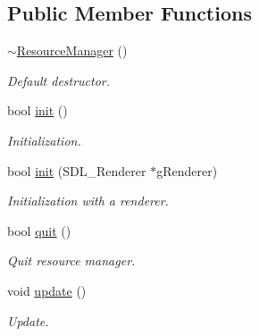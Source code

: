 \subsection*{Public Member Functions}
\begin{DoxyCompactItemize}
\item 
\mbox{\label{class_resource_manager_a671c186e4630599e7e36d000c53eaf80}} 
\mbox{\hyperlink{class_resource_manager_a671c186e4630599e7e36d000c53eaf80}{$\sim$\+Resource\+Manager}} ()
\begin{DoxyCompactList}\small\item\em Default destructor. \end{DoxyCompactList}\item 
\mbox{\label{class_resource_manager_a73b6b32515755b3819edc7ed8fc77605}} 
bool \mbox{\hyperlink{class_resource_manager_a73b6b32515755b3819edc7ed8fc77605}{init}} ()
\begin{DoxyCompactList}\small\item\em Initialization. \end{DoxyCompactList}\item 
\mbox{\label{class_resource_manager_a41cdd05a6fa0bbd41714179e112ff329}} 
bool \mbox{\hyperlink{class_resource_manager_a41cdd05a6fa0bbd41714179e112ff329}{init}} (S\+D\+L\+\_\+\+Renderer $\ast$g\+Renderer)
\begin{DoxyCompactList}\small\item\em Initialization with a renderer. \end{DoxyCompactList}\item 
\mbox{\label{class_resource_manager_ad53bb18eb54a3eb0e1158d728a3e15df}} 
bool \mbox{\hyperlink{class_resource_manager_ad53bb18eb54a3eb0e1158d728a3e15df}{quit}} ()
\begin{DoxyCompactList}\small\item\em Quit resource manager. \end{DoxyCompactList}\item 
\mbox{\label{class_resource_manager_aff5128be4888434f0f95c012af85df51}} 
void \mbox{\hyperlink{class_resource_manager_aff5128be4888434f0f95c012af85df51}{update}} ()
\begin{DoxyCompactList}\small\item\em Update. \end{DoxyCompactList}\item 

\end{DoxyCompactItemize}

